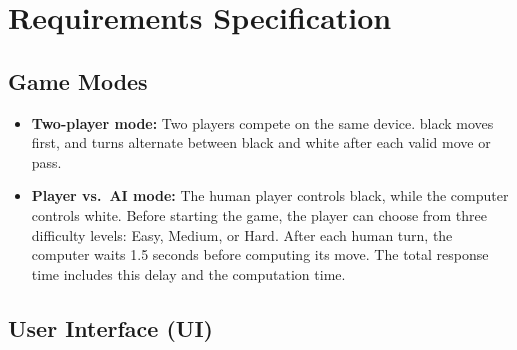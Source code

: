 \section{Requirements Specification}

\subsection{Game Modes}

\begin{itemize}
    \item \textbf{Two-player mode:} Two players compete on the same device.
    black moves first, and turns alternate between black and white after
    each valid move or pass.

    \item \textbf{Player vs.\ AI mode:} The human player controls black,
    while the computer controls white. Before starting the game, the player
    can choose from three difficulty levels: Easy, Medium, or Hard.
    After each human turn, the computer waits 1.5 seconds before computing
    its move. The total response time includes this delay and the computation time.
\end{itemize}

\subsection{User Interface (UI)}

